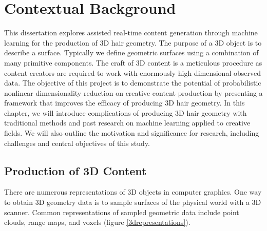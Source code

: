 \documentclass[ %
author={Dillon Keith Diep},
supervisor={Dr. Carl Henrik Ek},
degree={MEng},
title={ART-CG Hair:},
subtitle={Assisted Real-time Content Generation of Stylised Virtual Hair},
type={Research},
year={2017} ]{dissertation}
\begin{document}
	
	
	\mainmatter
	
	
	\chapter{Contextual Background}
	\label{chap:context}
	This dissertation explores assisted real-time content generation through machine learning for the production of 3D hair geometry.
	The purpose of a 3D object is to describe a surface. Typically we define geometric surfaces using a combination of many primitive components. The craft of 3D content is a meticulous procedure as content creators are required to work with enormously high dimensional observed data.
	The objective of this project is to demonstrate the potential of probabilistic nonlinear dimensionality reduction on creative content production by presenting a framework that improves the efficacy of producing 3D hair geometry. 
	In this chapter, we will introduce complications of producing 3D hair geometry with traditional methods and past research on machine learning applied to creative fields. We will also outline the motivation and significance for research, including challenges and central objectives of this study.
	
	\section{Production of 3D Content}
	There are numerous representations of 3D objects in computer graphics. One way to obtain 3D geometry data is to sample surfaces of the physical world with a 3D scanner. Common representations of sampled geometric data include point clouds, range maps, and voxels (figure \ref{3drepresentations}).
	
\end{document}
